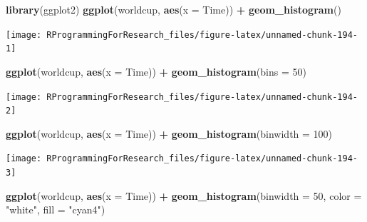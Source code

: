 \documentclass[]{book}
\makeatletter
\newenvironment{Shaded}{\begin{snugshade}}{\end{snugshade}}
\newcommand{\KeywordTok}[1]{\textcolor[rgb]{0.13,0.29,0.53}{\textbf{#1}}}
\newcommand{\DataTypeTok}[1]{\textcolor[rgb]{0.13,0.29,0.53}{#1}}
\newcommand{\DecValTok}[1]{\textcolor[rgb]{0.00,0.00,0.81}{#1}}
\newcommand{\StringTok}[1]{\textcolor[rgb]{0.31,0.60,0.02}{#1}}
\newcommand{\OperatorTok}[1]{\textcolor[rgb]{0.81,0.36,0.00}{\textbf{#1}}}
\newcommand{\NormalTok}[1]{#1}
\newenvironment{kframe}{%
\medskip{}
\setlength{\fboxsep}{.8em}
 \def\at@end@of@kframe{}%
 \ifinner\ifhmode%
  \def\at@end@of@kframe{\end{minipage}}%
  \begin{minipage}{\columnwidth}%
 \fi\fi%
 \def\FrameCommand##1{\hskip\@totalleftmargin \hskip-\fboxsep
 \colorbox{shadecolor}{##1}\hskip-\fboxsep
     \hskip-\linewidth \hskip-\@totalleftmargin \hskip\columnwidth}%
 \MakeFramed {\advance\hsize-\width
   \@totalleftmargin\z@ \linewidth\hsize
   \@setminipage}}%
 {\par\unskip\endMakeFramed%
 \at@end@of@kframe}
\renewenvironment{Shaded}{\begin{kframe}}{\end{kframe}}
\theoremstyle{definition}
\theoremstyle{definition}
\theoremstyle{definition}
\theoremstyle{remark}
\makeatother
\begin{document}
\begin{Shaded}
\begin{Highlighting}[]
\KeywordTok{library}\NormalTok{(ggplot2)}
\KeywordTok{ggplot}\NormalTok{(worldcup, }\KeywordTok{aes}\NormalTok{(}\DataTypeTok{x =}\NormalTok{ Time)) }\OperatorTok{+}\StringTok{ }
\StringTok{  }\KeywordTok{geom_histogram}\NormalTok{()}
\end{Highlighting}
\end{Shaded}

\begin{center}\texttt{[image: RProgrammingForResearch\_files/figure-latex/unnamed-chunk-194-1]} \end{center}

\begin{Shaded}
\begin{Highlighting}[]
\KeywordTok{ggplot}\NormalTok{(worldcup, }\KeywordTok{aes}\NormalTok{(}\DataTypeTok{x =}\NormalTok{ Time)) }\OperatorTok{+}\StringTok{ }
\StringTok{  }\KeywordTok{geom_histogram}\NormalTok{(}\DataTypeTok{bins =} \DecValTok{50}\NormalTok{)}
\end{Highlighting}
\end{Shaded}

\begin{center}\texttt{[image: RProgrammingForResearch\_files/figure-latex/unnamed-chunk-194-2]} \end{center}

\begin{Shaded}
\begin{Highlighting}[]
\KeywordTok{ggplot}\NormalTok{(worldcup, }\KeywordTok{aes}\NormalTok{(}\DataTypeTok{x =}\NormalTok{ Time)) }\OperatorTok{+}\StringTok{ }
\StringTok{  }\KeywordTok{geom_histogram}\NormalTok{(}\DataTypeTok{binwidth =} \DecValTok{100}\NormalTok{)}
\end{Highlighting}
\end{Shaded}

\begin{center}\texttt{[image: RProgrammingForResearch\_files/figure-latex/unnamed-chunk-194-3]} \end{center}

\begin{Shaded}
\begin{Highlighting}[]
\KeywordTok{ggplot}\NormalTok{(worldcup, }\KeywordTok{aes}\NormalTok{(}\DataTypeTok{x =}\NormalTok{ Time)) }\OperatorTok{+}\StringTok{ }
\StringTok{  }\KeywordTok{geom_histogram}\NormalTok{(}\DataTypeTok{binwidth =} \DecValTok{50}\NormalTok{, }\DataTypeTok{color =} \StringTok{"white"}\NormalTok{, }\DataTypeTok{fill =} \StringTok{"cyan4"}\NormalTok{)}
\end{Highlighting}
\end{Shaded}
\end{document}
